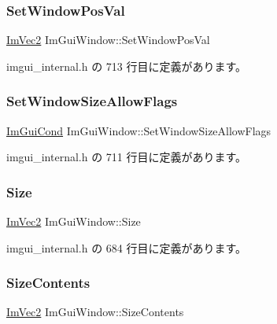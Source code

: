 \subsubsection{\texorpdfstring{Set\+Window\+Pos\+Val}{SetWindowPosVal}}
{\footnotesize\ttfamily \mbox{\hyperlink{struct_im_vec2}{Im\+Vec2}} Im\+Gui\+Window\+::\+Set\+Window\+Pos\+Val}



 imgui\+\_\+internal.\+h の 713 行目に定義があります。

\mbox{\label{struct_im_gui_window_a0c9419d95253214cb2a71d6ead1e03d6}} 
\subsubsection{\texorpdfstring{Set\+Window\+Size\+Allow\+Flags}{SetWindowSizeAllowFlags}}
{\footnotesize\ttfamily \mbox{\hyperlink{imgui_8h_aef890d6ac872e12c5804d0b3e4f7f103}{Im\+Gui\+Cond}} Im\+Gui\+Window\+::\+Set\+Window\+Size\+Allow\+Flags}



 imgui\+\_\+internal.\+h の 711 行目に定義があります。

\mbox{\label{struct_im_gui_window_a876e7aaf4cd824c8956238fba61387d5}} 
\subsubsection{\texorpdfstring{Size}{Size}}
{\footnotesize\ttfamily \mbox{\hyperlink{struct_im_vec2}{Im\+Vec2}} Im\+Gui\+Window\+::\+Size}



 imgui\+\_\+internal.\+h の 684 行目に定義があります。

\mbox{\label{struct_im_gui_window_a71097695729bf257ccaea824caf306a0}} 
\subsubsection{\texorpdfstring{Size\+Contents}{SizeContents}}
{\footnotesize\ttfamily \mbox{\hyperlink{struct_im_vec2}{Im\+Vec2}} Im\+Gui\+Window\+::\+Size\+Contents}



